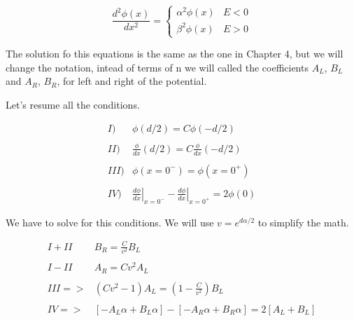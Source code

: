 \begin{equation}
  \label{5.20}
  \frac{d^2\phi(x)}{dx^2} =
  \left\{
  \begin{array}{lc}
    \alpha^2 \phi(x) & E < 0
    \\
    \beta^2  \phi(x) & E > 0
  \end{array}
  \right.
\end{equation}

The solution fo this equations is the same as the one in Chapter 4, but we will change the notation, intead of terms of n we will called the coefficients $A_L$, $B_L$ and $A_R$, $B_R$, for left and right of the potential.

Let's resume all the conditions.

\begin{equation}
  \label{5.21}
  \begin{array}{lc}
    I) & \phi(d/2) = C \phi(-d/2)

    \\

    \\

    II) & \frac{\phi}{dx}(d/2) = C \frac{\phi}{dx}(-d/2)

    \\

    \\

    III) & \phi(x=0^{-}) = \phi(x=0^{+})

    \\

    \\

    IV) & \left.\frac{d\phi}{dx}\right|_{x=0^{-}} - \left.\frac{d\phi}{dx}\right|_{x=0^{+}} = 2\phi(0)
  \end{array}
\end{equation}

We have to solve for this conditions. We will use $v = e^{d\alpha/2}$ to simplify the math.


\begin{equation}
  \label{5.22}
  \begin{array}{lc}

    I + II & B_R = \frac{C}{v^2} B_L

    \\

    \\

    I-II & A_R = C v^2 A_L

    \\

    \\

    III => & (Cv^2-1) A_L = (1-\frac{C}{v^2}) B_L

    \\

    \\

    IV => & [-A_L\alpha+B_L\alpha] - [-A_R\alpha + B_R\alpha] = 2[A_L + B_L]
  \end{array}
\end{equation}

